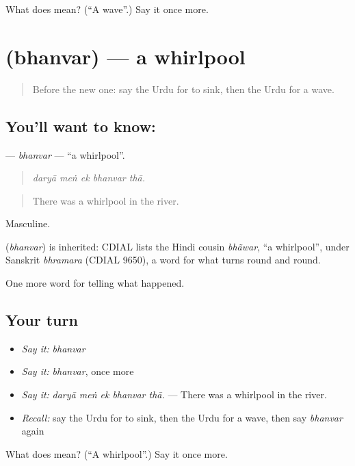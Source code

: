 \begin{tcolorbox}[breakable,colback=teal!4,colframe=teal!35!black,title={Before you move on}]
What does  mean? (\textquotedblleft{}A wave\textquotedblright{}.) Say it once more.
\end{tcolorbox}
\section[\texorpdfstring{\ur{بھنور} (bhanvar)}{بھنور (bhanvar)}]{ (bhanvar) — a whirlpool}

\label{lesson:UR-C293-bhanvar}



\begin{quote}
Before the new one: say the Urdu for to sink, then the Urdu for a wave.
\end{quote}

\subsection*{You'll want to know: }
\textbf{} — \emph{bhanvar} — \textquotedblleft{}a whirlpool\textquotedblright{}.

\begin{quote}
    
\end{quote}

\begin{quote}
\emph{daryā meṅ ek bhanvar thā.}
\end{quote}

\begin{quote}
There was a whirlpool in the river.
\end{quote}

Masculine.

\begin{cousinweb}
\textbf{} (\emph{bhanvar}) is inherited: CDIAL lists the Hindi cousin \emph{bhãwar}, \textquotedblleft{}a whirlpool\textquotedblright{}, under Sanskrit \emph{bhramara} (CDIAL 9650), a word for what turns round and round.
\end{cousinweb}

\begin{grammarlens}[title={What you've built}]
One more word for telling what happened.
\end{grammarlens}

\subsection*{Your turn}
\begin{itemize}
\raggedright
  \item \emph{Say it:} \emph{bhanvar}
  \item \emph{Say it:} \emph{bhanvar}, once more
  \item \emph{Say it:} \emph{daryā meṅ ek bhanvar thā.} — There was a whirlpool in the river.
  \item \emph{Recall:} say the Urdu for to sink, then the Urdu for a wave, then say \emph{bhanvar} again
\end{itemize}

\begin{tcolorbox}[breakable,colback=teal!4,colframe=teal!35!black,title={Before you move on}]
What does  mean? (\textquotedblleft{}A whirlpool\textquotedblright{}.) Say it once more.
\end{tcolorbox}

